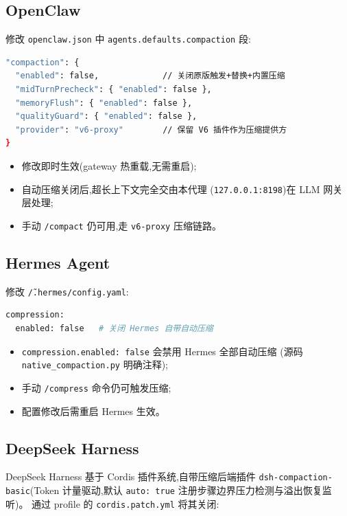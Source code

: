 \documentclass[11pt,a4paper]{article}
\begin{document}
\subsection{OpenClaw}

修改 \texttt{openclaw.json} 中 \texttt{agents.defaults.compaction} 段:

\begin{lstlisting}[language=bash]
"compaction": {
  "enabled": false,             // 关闭原版触发+替换+内置压缩
  "midTurnPrecheck": { "enabled": false },
  "memoryFlush": { "enabled": false },
  "qualityGuard": { "enabled": false },
  "provider": "v6-proxy"        // 保留 V6 插件作为压缩提供方
}
\end{lstlisting}

\begin{itemize}
  \item 修改即时生效(gateway 热重载,无需重启);
  \item 自动压缩关闭后,超长上下文完全交由本代理
        (\texttt{127.0.0.1:8198})在 LLM 网关层处理;
  \item 手动 \texttt{/compact} 仍可用,走 \texttt{v6-proxy} 压缩链路。
\end{itemize}

\subsection{Hermes Agent}

修改 \texttt{\~/.hermes/config.yaml}:

\begin{lstlisting}[language=bash]
compression:
  enabled: false   # 关闭 Hermes 自带自动压缩
\end{lstlisting}

\begin{itemize}
  \item \texttt{compression.enabled: false} 会禁用 Hermes 全部自动压缩
        (源码 \texttt{native\_compaction.py} 明确注释);
  \item 手动 \texttt{/compress} 命令仍可触发压缩;
  \item 配置修改后需重启 Hermes 生效。
\end{itemize}

\subsection{DeepSeek Harness}

DeepSeek Harness 基于 Cordis 插件系统,自带压缩后端插件
\texttt{dsh-compaction-basic}(Token 计量驱动,默认 \texttt{auto: true}
注册步骤边界压力检测与溢出恢复监听)。
通过 profile 的 \texttt{cordis.patch.yml} 将其关闭:
\end{document}
